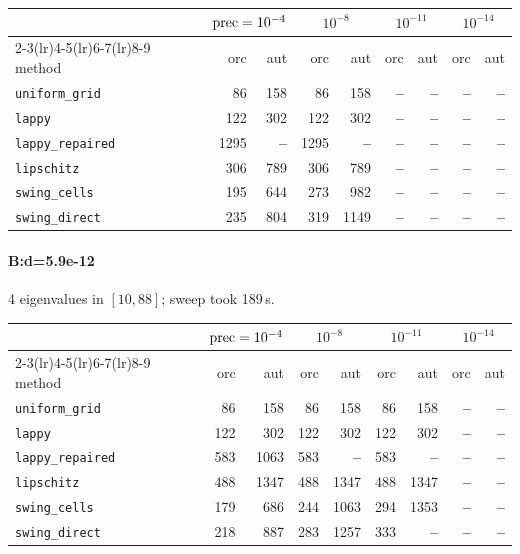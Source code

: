 \begin{center}
\small
\begin{tabular}{lrrrrrrrr}
\toprule
& \multicolumn{2}{c}{$\mathrm{prec}=10^{-4}$} & \multicolumn{2}{c}{$10^{-8}$} & \multicolumn{2}{c}{$10^{-11}$} & \multicolumn{2}{c}{$10^{-14}$} \\
\cmidrule(lr){2-3}\cmidrule(lr){4-5}\cmidrule(lr){6-7}\cmidrule(lr){8-9}
method & orc & aut & orc & aut & orc & aut & orc & aut \\
\midrule
\texttt{uniform\_grid} & 86 & 158 & 86 & 158 & \textbf{--} & \textbf{--} & \textbf{--} & \textbf{--} \\
\texttt{lappy} & 122 & 302 & 122 & 302 & \textbf{--} & \textbf{--} & \textbf{--} & \textbf{--} \\
\texttt{lappy\_repaired} & 1295 & \textbf{--} & 1295 & \textbf{--} & \textbf{--} & \textbf{--} & \textbf{--} & \textbf{--} \\
\texttt{lipschitz} & 306 & 789 & 306 & 789 & \textbf{--} & \textbf{--} & \textbf{--} & \textbf{--} \\
\texttt{swing\_cells} & 195 & 644 & 273 & 982 & \textbf{--} & \textbf{--} & \textbf{--} & \textbf{--} \\
\texttt{swing\_direct} & 235 & 804 & 319 & 1149 & \textbf{--} & \textbf{--} & \textbf{--} & \textbf{--} \\
\bottomrule
\end{tabular}
\end{center}

\paragraph{B:d=5.9e-12} 4 eigenvalues in $[10, 88]$; sweep took 189\,s.

\begin{center}
\small
\begin{tabular}{lrrrrrrrr}
\toprule
& \multicolumn{2}{c}{$\mathrm{prec}=10^{-4}$} & \multicolumn{2}{c}{$10^{-8}$} & \multicolumn{2}{c}{$10^{-11}$} & \multicolumn{2}{c}{$10^{-14}$} \\
\cmidrule(lr){2-3}\cmidrule(lr){4-5}\cmidrule(lr){6-7}\cmidrule(lr){8-9}
method & orc & aut & orc & aut & orc & aut & orc & aut \\
\midrule
\texttt{uniform\_grid} & 86 & 158 & 86 & 158 & 86 & 158 & \textbf{--} & \textbf{--} \\
\texttt{lappy} & 122 & 302 & 122 & 302 & 122 & 302 & \textbf{--} & \textbf{--} \\
\texttt{lappy\_repaired} & 583 & 1063 & 583 & \textbf{--} & 583 & \textbf{--} & \textbf{--} & \textbf{--} \\
\texttt{lipschitz} & 488 & 1347 & 488 & 1347 & 488 & 1347 & \textbf{--} & \textbf{--} \\
\texttt{swing\_cells} & 179 & 686 & 244 & 1063 & 294 & 1353 & \textbf{--} & \textbf{--} \\
\texttt{swing\_direct} & 218 & 887 & 283 & 1257 & 333 & \textbf{--} & \textbf{--} & \textbf{--} \\
\bottomrule
\end{tabular}
\end{center}

